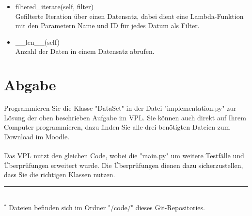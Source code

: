 \documentclass[]{article}
\begin{document}
\begin{itemize}
	\item filtered\_iterate(self, filter)\\
	\hspace*{1cm} Gefilterte Iteration über einen Datensatz, dabei dient eine Lambda-Funktion mit den Parametern Name und ID für jedes Datum als Filter.\\
	
	\item \_\_len\_\_(self)\\
	\hspace*{1cm} Anzahl der Daten in einem Datensatz abrufen.\\

\end{itemize}

\section{Abgabe}
Programmieren Sie die Klasse "DataSet" in der Datei "implementation.py" zur Lösung der oben beschrieben Aufgabe im VPL.
Sie können auch direkt auf Ihrem Computer programmieren, dazu finden Sie alle drei benötigten Dateien zum Download im Moodle.\\
\\
Das VPL nutzt den gleichen Code, wobei die "main.py" um weitere Testfälle und Überprüfungen erweitert wurde.
Die Überprüfungen dienen dazu sicherzustellen, dass Sie die richtigen Klassen nutzen.\\
%
\hrule\hfill\\[0.2cm]
$^*$ Dateien befinden sich im Ordner "/code/" dieses Git-Repositories.\\
\end{document}
